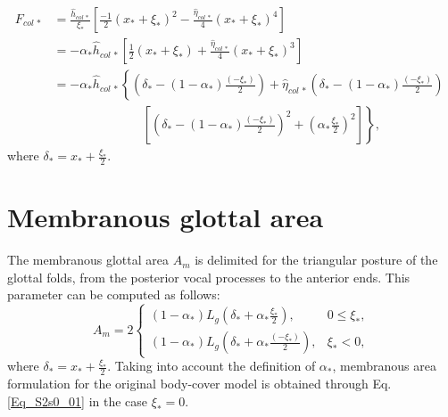 \documentclass[a4paper,10pt]{article}
\begin{document}
\begin{description}
    \begin{equation}
      \begin{aligned}
        F_{col\,*} & = \frac{\hat{h}_{col\,*}}{\xi_{*}} \left[\frac{-1}{2} (x_{*}+\xi_{*})^2 -
                         \frac{\hat{\eta}_{col\,*}}{4} (x_{*}+\xi_{*})^4  \right]     \\
                   & = - \alpha_{*} \hat{h}_{col\,*} \left[\frac{1}{2} (x_{*}+\xi_{*}) +
                         \frac{\hat{\eta}_{col\,*}}{4} (x_{*}+\xi_{*})^3  \right]     \\
                   & = - \alpha_{*} \hat{h}_{col\,*} \left\{
                            \left( \delta_{*} - (1 - \alpha_{*}) \frac{(-\xi_{*})}{2} \right)
                        + \hat{\eta}_{col\,*} \left( \delta_{*} - (1 - \alpha_{*}) \frac{(-\xi_{*})}{2} \right)
                        ^{\phantom{2}} \right. \\
                   & \hspace{3cm}   \left.  \left[
                            \left( \delta_{*} - (1 - \alpha_{*}) \frac{(-\xi_{*})}{2} \right)^2 + 
                            \left( \alpha_{*} \frac{\xi_{*}}{2} \right)^2  \right] \right\},
      \end{aligned}
    \end{equation}
    where $\delta_{*} = x_{*} + \frac{\xi_{*}}{2}$.
\end{description}


\section{Membranous glottal area}
The membranous glottal area $A_m$ is delimited for the triangular posture of the glottal folds, 
from the posterior vocal processes to the anterior ends. This parameter can be computed as follows:
\begin{equation} \label{Eq_S2s0_01}
  A_m = 2 \begin{cases}
            (1 - \alpha_{*}) L_{g} \left(\delta_{*} + \alpha_{*} \frac{\xi_{*}}{2} \right),
                & 0 \leq \xi_{*}, \\
            (1 - \alpha_{*}) L_{g} \left(\delta_{*} + \alpha_{*} \frac{(-\xi_{*})}{2} \right),
                & \xi_{*} <0,
          \end{cases}
\end{equation}
where $\delta_{*} = x_{*} + \frac{\xi_{*}}{2}$.
Taking into account the definition of $\alpha_{*}$, membranous area formulation for the original
body-cover model is obtained through Eq. \eqref{Eq_S2s0_01} in the case $\xi_{*}=0$.


\newpage

 

\end{document}
